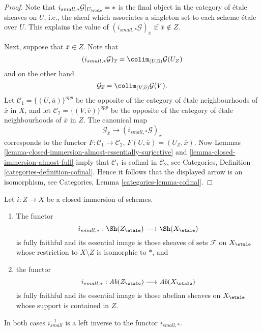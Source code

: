 \begin{proof}
Note that $i_{small, *}\mathcal{G}|_{U_\etale} = *$ is the final
object in the category of \'etale sheaves on $U$, i.e., the sheaf
which associates a singleton set to each scheme \'etale over $U$.
This explains the value of $(i_{small, *}\mathcal{G})_{\overline{x}}$
if $\overline{x} \not \in Z$.

\medskip\noindent
Next, suppose that $\overline{x} \in Z$. Note that
$$
(i_{small, *}\mathcal{G})_{\overline{x}}
=
\colim_{(U, \overline{u})} \mathcal{G}(U_Z)
$$
and on the other hand
$$
\mathcal{G}_{\overline{x}}
=
\colim_{(V, \overline{v})} \mathcal{G}(V).
$$
Let $\mathcal{C}_1 = \{(U, \overline{u})\}^{opp}$ be the opposite of the
category of \'etale neighbourhoods of $\overline{x}$ in $X$, and let
$\mathcal{C}_2 = \{(V, \overline{v})\}^{opp}$ be the opposite of the
category of \'etale neighbourhoods of $\overline{x}$ in $Z$. The canonical map
$$
\mathcal{G}_{\overline{x}}
\longrightarrow
(i_{small, *}\mathcal{G})_{\overline{x}}
$$
corresponds to the functor $F : \mathcal{C}_1 \to \mathcal{C}_2$,
$F(U, \overline{u}) = (U_Z, \overline{x})$. Now
Lemmas \ref{lemma-closed-immersion-almost-essentially-surjective} and
\ref{lemma-closed-immersion-almost-full}
imply that $\mathcal{C}_1$ is cofinal in $\mathcal{C}_2$, see
Categories, Definition \ref{categories-definition-cofinal}.
Hence it follows that the displayed arrow is an isomorphism, see
Categories, Lemma \ref{categories-lemma-cofinal}.
\end{proof}

\begin{proposition}
\label{proposition-closed-immersion-pushforward}
Let $i : Z \to X$ be a closed immersion of schemes.
\begin{enumerate}
\item The functor
$$
i_{small, *} :
\Sh(Z_\etale)
\longrightarrow
\Sh(X_\etale)
$$
is fully faithful and its essential image is those sheaves of sets
$\mathcal{F}$ on $X_\etale$ whose restriction to $X \setminus Z$ is
isomorphic to $*$, and
\item the functor
$$
i_{small, *} :
\textit{Ab}(Z_\etale)
\longrightarrow
\textit{Ab}(X_\etale)
$$
is fully faithful and its essential image is those abelian sheaves on
$X_\etale$ whose support is contained in $Z$.
\end{enumerate}
In both cases $i_{small}^{-1}$ is a left inverse to the functor
$i_{small, *}$.
\end{proposition}

